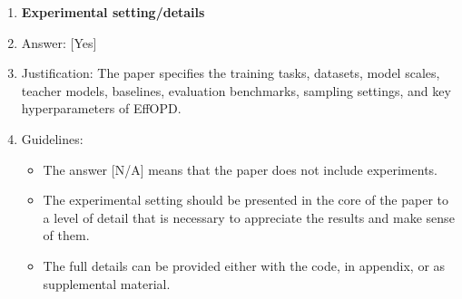 \documentclass{llmxive}
\providecommand{\answerYes}[1][]{[Yes]#1}
\providecommand{\answerNA}[1][]{[N/A]#1}
\begin{document}
\begin{enumerate}
\item {\bf Experimental setting/details}
    \item[] Answer: \answerYes{}
    \item[] Justification: The paper specifies the training tasks, datasets, model scales, teacher models, baselines, evaluation benchmarks, sampling settings, and key hyperparameters of EffOPD.
    \item[] Guidelines:
    \begin{itemize}
        \item The answer \answerNA{} means that the paper does not include experiments.
        \item The experimental setting should be presented in the core of the paper to a level of detail that is necessary to appreciate the results and make sense of them.
        \item The full details can be provided either with the code, in appendix, or as supplemental material.
    \end{itemize}


\end{enumerate}
\end{document}
